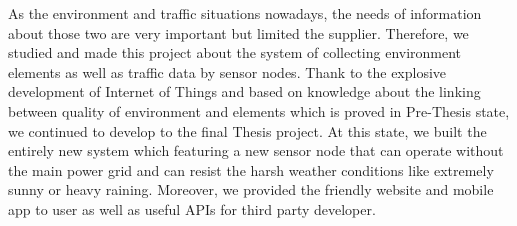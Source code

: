 \begin{abstract2}
\renewcommand{\abstractname}{ABSTRACT}

As the environment and traffic situations nowadays, the needs of information about those two are very important but limited the supplier. Therefore, we studied and made this project about the system of collecting environment elements as well as traffic data by sensor nodes. Thank to the explosive development of Internet of Things and based on knowledge about the linking between quality of environment and elements which is proved in Pre-Thesis state, we continued to develop to the final Thesis project. At this state, we built the entirely new system which featuring a new sensor node that can operate without the main power grid and can resist the harsh weather conditions like extremely sunny or heavy raining. Moreover, we provided the friendly website and mobile app to user as well as useful APIs for third party developer.
\end{abstract2}